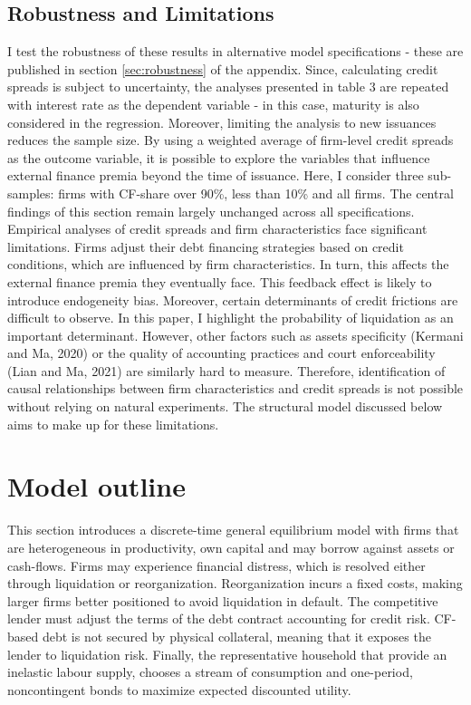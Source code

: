 \documentclass[12pt]{article}
\begin{document}
\subsection{Robustness and Limitations \label{sec:limitations}} 
I test the robustness of these results in alternative model specifications - these are published in section \ref{sec:robustness} of the appendix. Since, calculating credit spreads is subject to uncertainty, the analyses presented in table 3 are repeated with interest rate as the dependent variable - in this case, maturity is also considered in the regression. Moreover, limiting the analysis to new issuances reduces the sample size. By using a weighted average of firm-level credit spreads as the outcome variable, it is possible to explore the variables that influence external finance premia beyond the time of issuance. Here, I consider three sub-samples: firms with CF-share over 90\%, less than 10\% and all firms. The central findings of this section remain largely unchanged across all specifications. \vspace{3mm} \\
Empirical analyses of credit spreads and firm characteristics face significant limitations. Firms adjust their debt financing strategies based on credit conditions, which are influenced by firm characteristics. In turn, this affects the external finance premia they eventually face. This feedback effect is likely to introduce endogeneity bias. Moreover, certain determinants of credit frictions are difficult to observe. In this paper, I highlight the probability of liquidation as an important determinant. However, other factors such as assets specificity (Kermani and Ma, 2020) or the quality of accounting practices and court enforceability (Lian and Ma, 2021) are similarly hard to measure. Therefore, identification of causal relationships between firm characteristics and credit spreads is not possible without relying on natural experiments. The structural model discussed below aims to make up for these limitations. 

\section{Model outline} \label{sec:model}
This section introduces a discrete-time general equilibrium model with firms that are heterogeneous in productivity, own capital and may borrow against assets or cash-flows. Firms may experience financial distress, which is resolved either through liquidation or reorganization. Reorganization incurs a fixed costs, making larger firms better positioned to avoid liquidation in default. The competitive lender must adjust the terms of the debt contract accounting for credit risk. CF-based debt is not secured by physical collateral, meaning that it exposes the lender to liquidation risk. Finally, the representative household that provide an inelastic labour supply, chooses a stream of consumption and one-period, noncontingent bonds to maximize expected discounted utility. 
\end{document}
